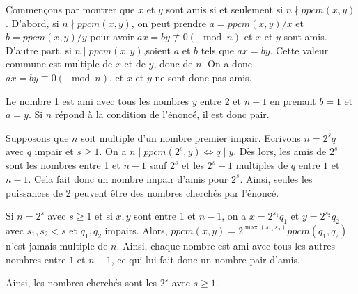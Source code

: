 Commençons par montrer que $x$ et $y$ sont amis si et seulement si $n\nmid ppcm (x,y)$. D'abord, si $n\nmid ppcm(x,y)$, on peut prendre $a=ppcm(x,y)/x$ et $b=ppcm(x,y)/y$ pour avoir $ax=by\not\equiv 0 (\mod n)$ et $x$ et $y$ sont amis. D'autre part, si $n\mid ppcm(x,y)$,soient $a$ et $b$ tels que $ax=by$. Cette valeur commune est multiple de $x$ et de $y$, donc de $n$. On a donc $ax=by\equiv0 (\mod n)$, et $x$ et $y$ ne sont donc pas amis.

Le nombre 1 est ami avec tous les nombres $y$ entre 2 et $n-1$ en prenant $b=1$ et $a=y$. Si $n$ répond à la condition de l'énoncé, il est donc pair.

Supposons que $n$ soit multiple d'un nombre premier impair. Ecrivons $n=2^sq$ avec $q$ impair et $s\ge 1$. On a $n\mid ppcm(2^s,y)\Longleftrightarrow q\mid y$. Dès lors, les amis de $2^s$ sont les nombres entre 1 et $n-1$ sauf $2^s$ et les $2^s-1$ multiples de $q$ entre $1$ et $n-1$. Cela fait donc un nombre impair d'amis pour $2^s$. Ainsi, seules les puissances de 2 peuvent être des nombres cherchés par l'énoncé.

Si $n=2^s$ avec $s\ge 1$ et si $x,y$ sont entre 1 et $n-1$, on a $x=2^{s_1}q_1$ et $y=2^{s_2}q_2$ avec $s_1,s_2<s$ et $q_1,q_2$ impairs. Alors, $ppcm(x,y)=2^{\max (s_1,s_2)}ppcm(q_1,q_2)$ n'est jamais multiple de $n$. Ainsi, chaque nombre est ami avec tous les autres nombres entre $1$ et $n-1$, ce qui lui fait donc un nombre pair d'amis.

Ainsi, les nombres cherchés sont les $2^s$ avec $s\ge 1$.